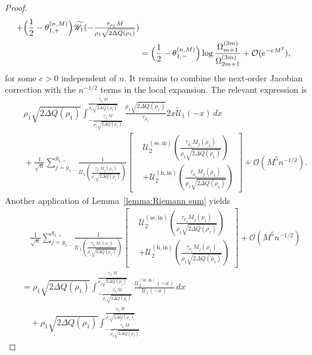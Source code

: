 \documentclass[a4paper]{article}
\numberwithin{equation}{section}
\begin{document}
\begin{proof}
\begin{align*}
+\Bigl(\frac{1}{2}-\theta_{1,+}^{(n,M)}\Bigr)
\widetilde{\mathscr{U}}_{1}(-\tfrac{\tau_{\rho_1}M}{\rho_1\sqrt{2\Delta Q(\rho_1)}})
\\
&=\Bigl(\frac{1}{2}-\theta_{1,-}^{(n,M)}\Bigr)\log\frac{\Omega_{m+1}^{(3m)}}{\Omega_{2m+1}^{(3m)}}
+
\mathcal{O}(e^{-cM^2}),
\end{align*}
for some $c>0$ independent of $n$.  It remains to combine the next-order
Jacobian correction with the $n^{-1/2}$ terms in the local expansion.  The
relevant expression is
\begin{align*}
&\quad \rho_1\sqrt{2\Delta Q(\rho_1)}
\int_{-\frac{\tau_{\rho_1}M}{\rho_1\sqrt{2\Delta Q(\rho_1)}}}^{\frac{\tau_{\rho_1}M}{\rho_1\sqrt{2\Delta Q(\rho_1)}}}
\frac{\rho_1\sqrt{2\Delta Q(\rho_1)}}{\tau_{\rho_1}}
2x\widetilde{\mathscr{U}}_1(-x)\,dx
\\
&\quad 
+\frac{1}{\sqrt{n}}
\sum_{j=g_{1,-}}^{g_{1,+}}
\frac{1}{\mathscr{U}_{1}(\tfrac{\tau_{\rho_1}M_j(\rho_1)}{\rho_1\sqrt{2\Delta Q(\rho_1)}})}
\left[\begin{aligned}&
\mathscr{U}_{2}^{(\mathrm{se},\mathrm{in})}(\tfrac{\tau_{\rho_1}M_j(\rho_1)}{\rho_1\sqrt{2\Delta Q(\rho_1)}})
\\
&+
\mathscr{U}_{2}^{(\mathrm{h,in})}(\tfrac{\tau_{\rho_1}M_j(\rho_1)}{\rho_1\sqrt{2\Delta Q(\rho_1)}})
\end{aligned}\right]
+\mathcal{O}(M^5n^{-1/2}).
\end{align*}
Another application of Lemma~\ref{lemma:Riemann sum} yields
\begin{align*}
 &\quad 
 \frac{1}{\sqrt{n}}
\sum_{j=g_{1,-}}^{g_{1,+}}
\frac{1}{\mathscr{U}_{1}(\tfrac{\tau_{\rho_1}M_j(\rho_1)}{\rho_1\sqrt{2\Delta Q(\rho_1)}})}
\left[\begin{aligned}&
\mathscr{U}_{2}^{(\mathrm{se},\mathrm{in})}(\tfrac{\tau_{\rho_1}M_j(\rho_1)}{\rho_1\sqrt{2\Delta Q(\rho_1)}})
\\
&+
\mathscr{U}_{2}^{(\mathrm{h,in})}(\tfrac{\tau_{\rho_1}M_j(\rho_1)}{\rho_1\sqrt{2\Delta Q(\rho_1)}})
\end{aligned}\right]
+\mathcal{O}(M^5n^{-1/2})
\\
&=
\rho_1\sqrt{2\Delta Q(\rho_1)}
\int_{-\frac{\tau_{\rho_1}M}{\rho_1\sqrt{2\Delta Q(\rho_1)}}}^{\frac{\tau_{\rho_1}M}{\rho_1\sqrt{2\Delta Q(\rho_1)}}}
\frac{\mathscr{U}_{2}^{(\mathrm{se},\mathrm{in})}(-x)}{\mathscr{U}_{1}(-x)}\,dx
\\
&\quad+
\rho_1\sqrt{2\Delta Q(\rho_1)}
\int_{-\frac{\tau_{\rho_1}M}{\rho_1\sqrt{2\Delta Q(\rho_1)}}}^{\frac{\tau_{\rho_1}M}{\rho_1\sqrt{2\Delta Q(\rho_1)}}}

\end{align*}
\end{proof}
\end{document}
